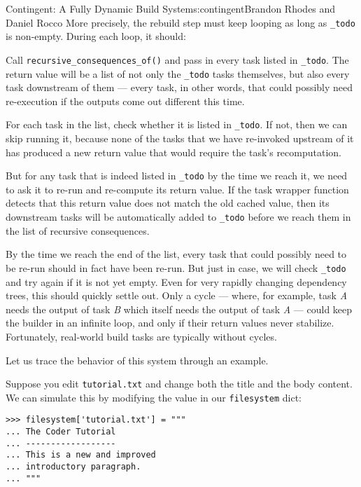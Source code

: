 \begin{aosachapter}{Contingent: A Fully Dynamic Build System}{s:contingent}{Brandon Rhodes and Daniel Rocco}
More precisely, the rebuild step must keep looping as long as
\texttt{\_todo} is non-empty. During each loop, it should:

\begin{aosaitemize}
\item
  Call \texttt{recursive\_consequences\_of()} and pass in every task
  listed in \texttt{\_todo}. The return value will be a list of not only
  the \texttt{\_todo} tasks themselves, but also every task downstream
  of them --- every task, in other words, that could possibly need
  re-execution if the outputs come out different this time.
\item
  For each task in the list, check whether it is listed in
  \texttt{\_todo}. If not, then we can skip running it, because none of
  the tasks that we have re-invoked upstream of it has produced a new
  return value that would require the task's recomputation.
\item
  But for any task that is indeed listed in \texttt{\_todo} by the time
  we reach it, we need to ask it to re-run and re-compute its return
  value. If the task wrapper function detects that this return value
  does not match the old cached value, then its downstream tasks will be
  automatically added to \texttt{\_todo} before we reach them in the
  list of recursive consequences.
\end{aosaitemize}

By the time we reach the end of the list, every task that could possibly
need to be re-run should in fact have been re-run. But just in case, we
will check \texttt{\_todo} and try again if it is not yet empty. Even
for very rapidly changing dependency trees, this should quickly settle
out. Only a cycle --- where, for example, task \emph{A} needs the output
of task \emph{B} which itself needs the output of task \emph{A} ---
could keep the builder in an infinite loop, and only if their return
values never stabilize. Fortunately, real-world build tasks are
typically without cycles.

Let us trace the behavior of this system through an example.

Suppose you edit \texttt{tutorial.txt} and change both the title and the
body content. We can simulate this by modifying the value in our
\texttt{filesystem} dict:

\begin{verbatim}
>>> filesystem['tutorial.txt'] = """
... The Coder Tutorial
... ------------------
... This is a new and improved
... introductory paragraph.
... """
\end{verbatim}


\end{aosachapter}
